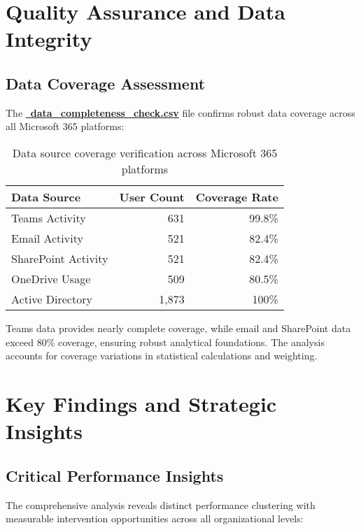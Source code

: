 \documentclass[12pt,a4paper]{article}
\begin{document}
\section{Quality Assurance and Data Integrity}

\subsection{Data Coverage Assessment}

The \textcolor{successGreen}{\href{https://fixysaskihumorizijuv.supabase.co/storage/v1/object/public/research-files/28c816b5-f241-4749-80a7-f8e75b78f052-data_completeness_check.csv?download=}{{\normalsize\faShieldAlt}\, \textbf{data\_completeness\_check.csv}}} file confirms robust data coverage across all Microsoft 365 platforms:

\begin{table}[H]
\centering
\begin{tabular}{@{}lrr@{}}
\toprule
\textbf{\color{primaryBlue}Data Source} & \textbf{\color{primaryBlue}User Count} & \textbf{\color{primaryBlue}Coverage Rate} \\
\midrule
Teams Activity & 631 & 99.8\% \\
Email Activity & 521 & 82.4\% \\
SharePoint Activity & 521 & 82.4\% \\
OneDrive Usage & 509 & 80.5\% \\
Active Directory & 1,873 & 100\% \\
\bottomrule
\end{tabular}
\caption{Data source coverage verification across Microsoft 365 platforms}
\end{table}

Teams data provides nearly complete coverage, while email and SharePoint data exceed 80\% coverage, ensuring robust analytical foundations. The analysis accounts for coverage variations in statistical calculations and weighting.



\section{Key Findings and Strategic Insights}

\subsection{Critical Performance Insights}

The comprehensive analysis reveals distinct performance clustering with measurable intervention opportunities across all organizational levels:
\end{document}
